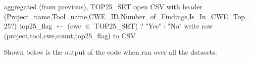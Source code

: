 \begin{algorithm}[H]
\caption{Write consolidated CSV}
\begin{algorithmic}[1]
\REQUIRE aggregated (from previous), TOP25\_SET
\STATE open CSV with header (Project\_name,Tool\_name,CWE\_ID,Number\_of\_Findings,Is\_In\_CWE\_Top\_25?)
  \STATE top25\_flag $\leftarrow$ (cwe $\in$ TOP25\_SET) ? "Yes" : "No"
  \STATE write row (project,tool,cwe,count,top25\_flag) to CSV
\ENDFOR
\end{algorithmic}
\end{algorithm}



Shown below is the output of the code when run over all the datasets:

